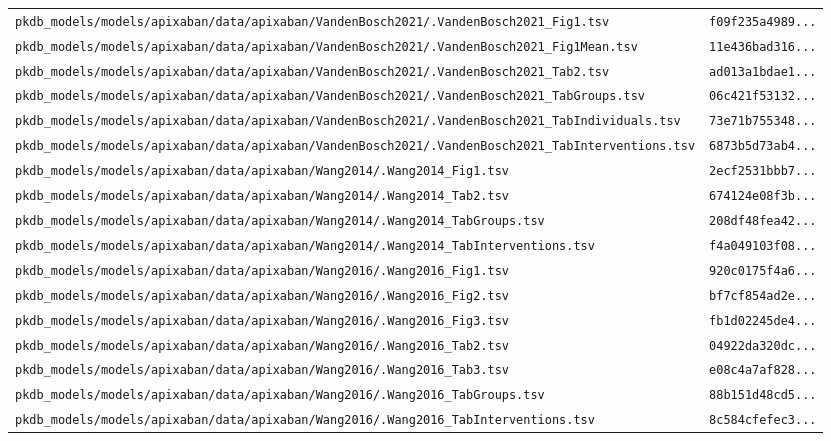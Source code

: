 \begin{longtable}{ll}
\texttt{pkdb\_models/models/apixaban/data/apixaban/VandenBosch2021/.VandenBosch2021\_Fig1.tsv} & \texttt{f09f235a4989...} \\
\texttt{pkdb\_models/models/apixaban/data/apixaban/VandenBosch2021/.VandenBosch2021\_Fig1Mean.tsv} & \texttt{11e436bad316...} \\
\texttt{pkdb\_models/models/apixaban/data/apixaban/VandenBosch2021/.VandenBosch2021\_Tab2.tsv} & \texttt{ad013a1bdae1...} \\
\texttt{pkdb\_models/models/apixaban/data/apixaban/VandenBosch2021/.VandenBosch2021\_TabGroups.tsv} & \texttt{06c421f53132...} \\
\texttt{pkdb\_models/models/apixaban/data/apixaban/VandenBosch2021/.VandenBosch2021\_TabIndividuals.tsv} & \texttt{73e71b755348...} \\
\texttt{pkdb\_models/models/apixaban/data/apixaban/VandenBosch2021/.VandenBosch2021\_TabInterventions.tsv} & \texttt{6873b5d73ab4...} \\
\texttt{pkdb\_models/models/apixaban/data/apixaban/Wang2014/.Wang2014\_Fig1.tsv} & \texttt{2ecf2531bbb7...} \\
\texttt{pkdb\_models/models/apixaban/data/apixaban/Wang2014/.Wang2014\_Tab2.tsv} & \texttt{674124e08f3b...} \\
\texttt{pkdb\_models/models/apixaban/data/apixaban/Wang2014/.Wang2014\_TabGroups.tsv} & \texttt{208df48fea42...} \\
\texttt{pkdb\_models/models/apixaban/data/apixaban/Wang2014/.Wang2014\_TabInterventions.tsv} & \texttt{f4a049103f08...} \\
\texttt{pkdb\_models/models/apixaban/data/apixaban/Wang2016/.Wang2016\_Fig1.tsv} & \texttt{920c0175f4a6...} \\
\texttt{pkdb\_models/models/apixaban/data/apixaban/Wang2016/.Wang2016\_Fig2.tsv} & \texttt{bf7cf854ad2e...} \\
\texttt{pkdb\_models/models/apixaban/data/apixaban/Wang2016/.Wang2016\_Fig3.tsv} & \texttt{fb1d02245de4...} \\
\texttt{pkdb\_models/models/apixaban/data/apixaban/Wang2016/.Wang2016\_Tab2.tsv} & \texttt{04922da320dc...} \\
\texttt{pkdb\_models/models/apixaban/data/apixaban/Wang2016/.Wang2016\_Tab3.tsv} & \texttt{e08c4a7af828...} \\
\texttt{pkdb\_models/models/apixaban/data/apixaban/Wang2016/.Wang2016\_TabGroups.tsv} & \texttt{88b151d48cd5...} \\
\texttt{pkdb\_models/models/apixaban/data/apixaban/Wang2016/.Wang2016\_TabInterventions.tsv} & \texttt{8c584cfefec3...} \\

\end{longtable}
